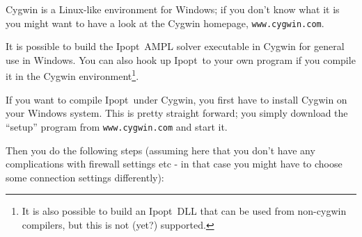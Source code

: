 \documentclass[10pt]{article}
\newcommand{\Ipopt}{{\sc Ipopt}}
\begin{document}
Cygwin is a Linux-like environment for Windows; if you don't know what
it is you might want to have a look at the Cygwin homepage,
\texttt{www.cygwin.com}.

It is possible to build the \Ipopt\ AMPL solver executable in Cygwin
for general use in Windows.  You can also hook up \Ipopt\ to your own
program if you compile it in the Cygwin environment\footnote{It is
  also possible to build an \Ipopt\ DLL that can be used from
  non-cygwin compilers, but this is not (yet?) supported.}.

If you want to compile \Ipopt\ under Cygwin, you first have to install
Cygwin on your Windows system.  This is pretty straight forward; you
simply download the ``setup'' program from
\texttt{www.cygwin.com} and start it.

Then you do the following steps (assuming here that you don't have any
complications with firewall settings etc - in that case you might have
to choose some connection settings differently):
\end{document}
